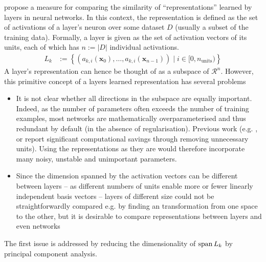 \citet{raghu2017svcca} propose a measure for comparing the similarity of
``representations'' learned by layers in neural networks. In this context, the
representation is defined as the set of activations of a layer's neuron over
some dataset $D$ (usually a subset of the training data). Formally, a layer is given
as the set of activation vectors of its units, each of which has $n := |D|$ individual
activations.
\begin{align}
    L_k & :=  \left\{ (a_{k,i}(\mathbf{x}_0), \ldots, a_{k,i}(\mathbf{x}_{n-1})) \mid i \in [0,n_\text{units})\right\}
\end{align}
A layer's representation can hence be thought of as a subspace of
$\mathcal{R}^n$. However, this primitive concept of a layers learned
representation has several problems
\begin{itemize}
    \item It is not clear whether all directions in the subspace are equally
        important. Indeed, as the number of parameters often exceeds the number
        of training examples, most networks are mathematically overparameterised
        and thus redundant by default (in the absence of regularisation).
        Previous work (e.g. \citep{lecun1990optimal}, \citep{srinivas2015data}
        or \citep{molchanov2016pruning} report significant computational savings
        through removing unnecessary units). Using the representations as they
        are would therefore incorporate many noisy, unstable and unimportant
        parameters.
    \item Since the dimension spanned by the activation vectors can be different
        between layers -- as different numbers of units enable more or fewer
        linearly independent basis vectors -- layers of different size could not
        be straightforwardly compared e.g. by finding an transformation from one
        space to the other, but it is desirable to compare representations
        between layers and even networks
\end{itemize}

The first issue is addressed by reducing the dimensionality of $\operatorname{span}{L_k}$ by
principal component analysis.

